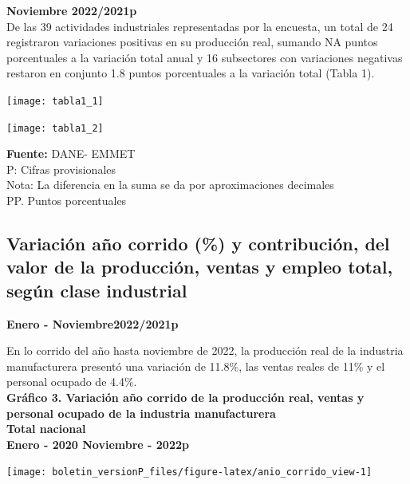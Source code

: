 \documentclass[
]{article}
\begin{document}
\textbf{Noviembre 2022/2021p}\\

De las 39 actividades industriales representadas por la encuesta, un
total de 24 registraron variaciones positivas en su producción real,
sumando NA puntos porcentuales a la variación total anual y 16
subsectores con variaciones negativas restaron en conjunto 1.8 puntos
porcentuales a la variación total (Tabla 1).

\begin{center}\texttt{[image: tabla1\_1]} \end{center}

\begin{center}\texttt{[image: tabla1\_2]} \end{center}

\textbf{Fuente:} DANE- EMMET\\
P: Cifras provisionales\\
Nota: La diferencia en la suma se da por aproximaciones decimales\\
PP. Puntos porcentuales\\

\newpage

\hypertarget{variaciuxf3n-auxf1o-corrido-y-contribuciuxf3n-del-valor-de-la-producciuxf3n-ventas-y-empleo-total-seguxfan-clase-industrial}{%
\subsection{Variación año corrido (\%) y contribución, del valor de la
producción, ventas y empleo total, según clase
industrial}\label{variaciuxf3n-auxf1o-corrido-y-contribuciuxf3n-del-valor-de-la-producciuxf3n-ventas-y-empleo-total-seguxfan-clase-industrial}}

\textbf{Enero - Noviembre2022/2021p}

En lo corrido del año hasta noviembre de 2022, la producción real de la
industria manufacturera presentó una variación de 11.8\%, las ventas
reales de 11\% y el personal ocupado de 4.4\%.\\

\textbf{Gráfico 3. Variación año corrido de la producción real, ventas y
personal ocupado de la industria manufacturera}\\
\textbf{Total nacional}\\
\textbf{Enero - 2020 Noviembre - 2022p}\\

\begin{center}\texttt{[image: boletin\_versionP\_files/figure-latex/anio\_corrido\_view-1]} \end{center}
\end{document}
